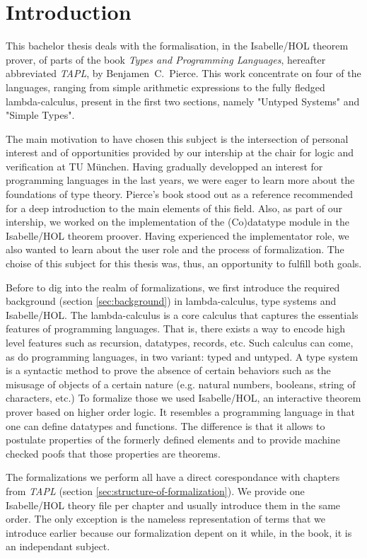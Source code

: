 \section{Introduction}

This bachelor thesis deals with the formalisation, in the Isabelle/HOL theorem prover, of parts of
the book \emph{Types and Programming Languages}, hereafter abbreviated \emph{TAPL}, by
Benjamen~C.~Pierce. This work concentrate on four of the languages, ranging from simple arithmetic
expressions to the fully fledged lambda-calculus, present in the first two sections, namely "Untyped
Systems" and "Simple Types".

The main motivation to have chosen this subject is the intersection of personal interest and of
opportunities provided by our intership at the chair for logic and verification at TU München.
Having gradually developped an interest for programming languages in the last years, we were eager
to learn more about the foundations of type theory. Pierce's book stood out as a reference
recommended for a deep introduction to the main elements of this field. Also, as part of our
intership, we worked on the implementation of the (Co)datatype module in the Isabelle/HOL theorem
proover. Having experienced the implementator role, we also wanted to learn about the user role and
the process of formalization. The choise of this subject for this thesis was, thus, an opportunity
to fulfill both goals.

Before to dig into the realm of formalizations, we first introduce the required background (section
\ref{sec:background}) in lambda-calculus, type systems and Isabelle/HOL. The lambda-calculus is a
core calculus that captures the essentials features of programming languages. That is, there exists
a way to encode high level features such as recursion, datatypes, records, etc. Such calculus can
come, as do programming languages, in two variant: typed and untyped. A type system is a syntactic
method to prove the absence of certain behaviors such as the misusage of objects of a certain nature
(e.g. natural numbers, booleans, string of characters, etc.) To formalize those we used
Isabelle/HOL, an interactive theorem prover based on higher order logic. It resembles a programming
language in that one can define datatypes and functions. The difference is that it allows to
postulate properties of the formerly defined elements and to provide machine checked poofs that
those properties are theorems.

The formalizations we perform all have a direct corespondance with chapters from \emph{TAPL}
(section \ref{sec:structure-of-formalization}). We provide one Isabelle/HOL theory file per chapter
and usually introduce them in the same order. The only exception is the nameless representation of
terms that we introduce earlier because our formalization depent on it while, in the book, it is an
independant subject.

